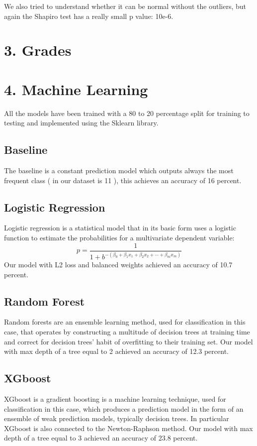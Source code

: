 \documentclass[a4paper, 11pt]{report}
\theoremstyle{definition}
\numberwithin{equation}{section}		%
\numberwithin{figure}{section}			%
\numberwithin{table}{section}				%
\begin{document}
We also tried to understand whether it can be normal without the outliers, but again the Shapiro test has a really small p value: 10e-6.

\section*{3. Grades}


\section*{4. Machine Learning}

All the models have been trained with a 80 to 20 percentage split for training to testing and implemented using the Sklearn library.

\subsection*{Baseline}
The baseline is a constant prediction model which outputs always the most frequent class ( in our dataset is 11 ), this achieves an accuracy of 16 percent.
\subsection*{Logistic Regression}
Logistic regression is a statistical model that in its basic form uses a logistic function to estimate the probabilities for a multivariate dependent variable: $$p=\frac{1}{1+b^{-\left(\beta_{0}+\beta_{1} x_{1}+\beta_{2} x_{2}+\cdots+\beta_{m} x_{m}\right)}}$$
Our model with L2 loss and balanced weights achieved an accuracy of 10.7 percent. 
\subsection*{Random Forest}
Random forests are an ensemble learning method, used for classification in this case, that operates by constructing a multitude of decision trees at training time and correct for decision trees' habit of overfitting to their training set. Our model with max depth of a tree equal to 2 achieved an accuracy of 12.3 percent.
\subsection*{XGboost}
XGboost is a gradient boosting is a machine learning technique, used for classification in this case, which produces a prediction model in the form of an ensemble of weak prediction models, typically decision trees. In particular XGboost is also connected to the Newton-Raphson method. Our model with max depth of a tree equal to 3 achieved an accuracy of 23.8 percent.
\end{document}
